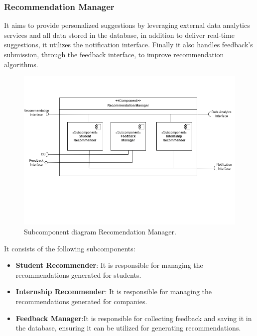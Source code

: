 \subsubsection{Recommendation Manager} It aims to provide personalized suggestions by leveraging external data analytics services and all data stored in the database, in addition to deliver real-time suggestions, it utilizes the notification interface. Finally it also handles feedback's submission, through the feedback interface, to improve recommendation algorithms.
 \begin{figure}[H]
    \centering
    \includegraphics[width=\linewidth]{DD/Images/Comp&Sub/ReccomandationManager.png}
    \caption{Subcomponent diagram Recomendation Manager.}
    \label{fig:reccomendation_manager}
    \end{figure}

    It consists of the following subcomponents:
\begin{itemize}
    \item  \textbf{Student Recommender}: It is responsible for managing the recommendations generated for students.
    \item  \textbf{Internship Recommender}: It is responsible for managing the recommendations generated for companies.
    \item  \textbf{Feedback Manager}:It is responsible for collecting feedback and saving it in the database, ensuring it can be utilized for generating recommendations.
    \end{itemize}
    
 \clearpage %
